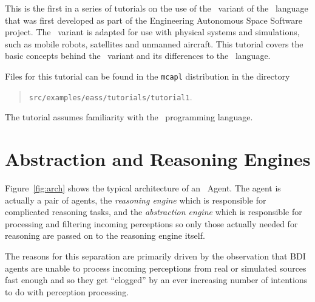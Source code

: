 
This is the first in a series of tutorials on the use of the \eass\ variant of the \gwendolen\ language that was first developed as part of the Engineering Autonomous Space Software project.  The \eass\ variant is adapted for use with physical systems and simulations, such as mobile robots, satellites and unmanned aircraft.  This tutorial covers the basic concepts behind the \eass\ variant and its differences to the \gwendolen\ language.  

Files for this tutorial can be found in the \texttt{mcapl} distribution in the directory 
\begin{quote}
\texttt{src/examples/eass/tutorials/tutorial1}.
\end{quote}

The tutorial assumes familiarity with the \gwendolen\ programming language.

\section{Abstraction and Reasoning Engines}

Figure~\ref{fig:arch} shows the typical architecture of an \eass\ Agent.  The agent is actually a pair of agents, the \emph{reasoning engine} which is responsible for complicated reasoning tasks, and the \emph{abstraction engine} which is responsible for processing and filtering incoming perceptions so only those actually needed for reasoning are passed on to the reasoning engine itself.

The reasons for this separation are primarily driven by the observation that BDI agents are unable to process incoming perceptions from real or simulated sources fast enough and so they get ``clogged'' by an ever increasing number of intentions to do with perception processing.  

